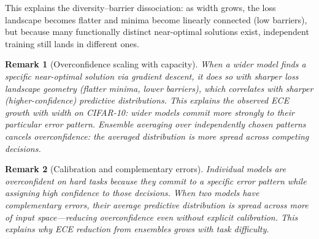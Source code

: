 \documentclass[11pt]{article}
\newtheorem{remark}{Remark}
\begin{document}
This explains the diversity--barrier dissociation: as width grows, the
loss landscape becomes flatter and minima become linearly connected (low
barriers), but because many functionally distinct near-optimal solutions
exist, independent training still lands in different ones.

\begin{remark}[Overconfidence scaling with capacity]
When a wider model finds a specific near-optimal solution via gradient
descent, it does so with sharper loss landscape geometry (flatter minima,
lower barriers), which correlates with sharper (higher-confidence)
predictive distributions.  This explains the observed ECE growth with
width on CIFAR-10: wider models commit more strongly to their particular
error pattern.  Ensemble averaging over independently chosen patterns
cancels overconfidence: the averaged distribution is more spread across
competing decisions.
\end{remark}

\begin{remark}[Calibration and complementary errors]
Individual models are overconfident on hard tasks because they commit to
a specific error pattern while assigning high confidence to those
decisions.  When two models have complementary errors, their average
predictive distribution is spread across more of input space—reducing
overconfidence even without explicit calibration.  This explains why
ECE reduction from ensembles grows with task difficulty.
\end{remark}
\end{document}
